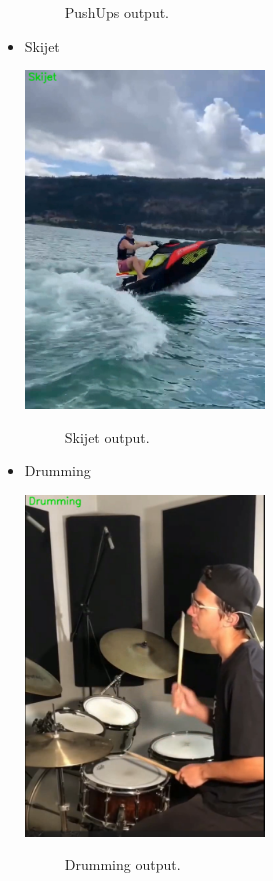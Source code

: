 \begin{itemize}
\begin{figure}[h!]
    	\caption[PushUps output .]{PushUps output.}
    	\label{pushup_lrcn.png} 
        \end{figure}
        
    \item Skijet

        \includegraphics[width=0.5\textwidth]{Figures/skijet_lrcn.png}
        \begin{figure}[h!]
    	\centering
    	
    	\caption[Skijet output .]{Skijet output.}
    	\label{skijet_lrcn.png} 
        \end{figure}

    \item Drumming

        \includegraphics[width=0.5\textwidth]{Figures/drum_lrcn.png}
        \begin{figure}[h!]
    	\centering
    	
    	\caption[Drumming output .]{Drumming output.}
    	\label{drum_lrcn.png} 
        \end{figure}
    
\end{itemize}



